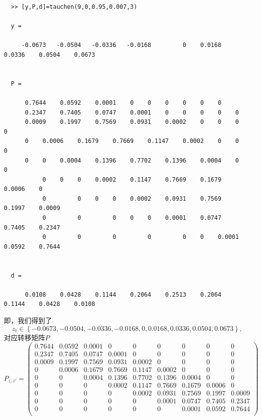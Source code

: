 \begin{subappendices}
\begin{verbatim}
  >> [y,P,d]=tauchen(9,0,0.95,0.007,3)

  y =

     -0.0673   -0.0504   -0.0336   -0.0168         0    0.0168    0.0336    0.0504    0.0673


  P =

      0.7644    0.0592    0.0001    0    0    0    0    0    0
      0.2347    0.7405    0.0747    0.0001    0    0    0    0    0
      0.0009    0.1997    0.7569    0.0931    0.0002    0    0    0    0
      0    0.0006    0.1679    0.7669    0.1147    0.0002    0    0    0
      0    0    0.0004    0.1396    0.7702    0.1396    0.0004    0    0
           0    0    0    0.0002    0.1147    0.7669    0.1679    0.0006    0
           0         0    0    0    0.0002    0.0931    0.7569    0.1997    0.0009
           0         0         0    0    0    0.0001    0.0747    0.7405    0.2347
           0         0         0         0         0    0    0.0001    0.0592    0.7644


  d =

      0.0108    0.0428    0.1144    0.2064    0.2513    0.2064    0.1144    0.0428    0.0108

\end{verbatim}

即，我们得到了
\begin{equation*}
  z_t \in \left\{ -0.0673 ,  -0.0504,   -0.0336,   -0.0168,         0,    0.0168,    0.0336,    0.0504,    0.0673 \right\},
\end{equation*}
对应转移矩阵$P$
\begin{equation*}
P_{z,z'} = \begin{pmatrix}
0.7644&    0.0592&    0.0001&   0&    0&    0&    0&    0&    0 \\
0.2347&    0.7405&    0.0747&    0.0001&    0&    0&    0&    0&    0 \\
0.0009&    0.1997&    0.7569&    0.0931&    0.0002&    0&    0&    0&    0\\
0&    0.0006&    0.1679&    0.7669&    0.1147&    0.0002&    0&    0&    0\\
0&    0&    0.0004&    0.1396&    0.7702&    0.1396&    0.0004&    0&    0\\
0&    0&    0&    0.0002&    0.1147&    0.7669&    0.1679&    0.0006&    0\\
0&         0&    0&    0&    0.0002&    0.0931&    0.7569&    0.1997&    0.0009\\
0&         0&         0&    0&    0&    0.0001&    0.0747&    0.7405&    0.2347\\
0&         0&         0&         0&         0&    0&    0.0001&    0.0592&    0.7644\\
\end{pmatrix}
\end{equation*}




\end{subappendices}
